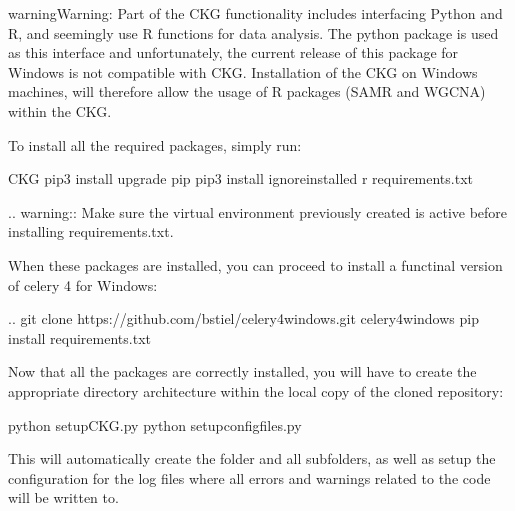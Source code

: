 \documentclass[letterpaper,10pt,english]{sphinxmanual}
\begin{document}
\begin{sphinxadmonition}{warning}{Warning:}
Part of the CKG functionality includes interfacing Python and R, and seemingly use R functions for data analysis. The python package  is used as this interface and unfortunately, the current release of this package for Windows is not compatible with CKG. Installation of the CKG on Windows machines, will therefore  allow the usage of R packages (SAMR and WGCNA) within the CKG.
\end{sphinxadmonition}

To install all the required packages, simply run:

\begin{sphinxVerbatim}[commandchars=\\\{\}]
\PYGZgt{}  CKG
\PYGZgt{} pip3 install \PYGZhy{}\PYGZhy{}upgrade pip
\PYGZgt{} pip3 install \PYGZhy{}\PYGZhy{}ignore\PYGZhy{}installed \PYGZhy{}r requirements.txt

.. warning:: Make sure the virtual environment previously created is active before installing requirements.txt.
\end{sphinxVerbatim}

When these packages are installed, you can proceed to install a functinal version of celery 4 for Windows:

\begin{sphinxVerbatim}[commandchars=\\\{\}]
\PYGZgt{}  ..
\PYGZgt{} git clone https://github.com/bstiel/celery\PYGZhy{}4\PYGZhy{}windows.git
\PYGZgt{}  celery\PYGZhy{}4\PYGZhy{}windows
\PYGZgt{} pip install requirements.txt
\end{sphinxVerbatim}

Now that all the packages are correctly installed, you will have to create the appropriate directory architecture within the local copy of the cloned repository:

\begin{sphinxVerbatim}[commandchars=\\\{\}]
\PYGZgt{} python setup\PYGZus{}CKG.py
\PYGZgt{} python setup\PYGZus{}config\PYGZus{}files.py
\end{sphinxVerbatim}

This will automatically create the  folder and all subfolders, as well as setup the configuration for the log files where all errors and warnings related to the code will be written to.
\end{document}
